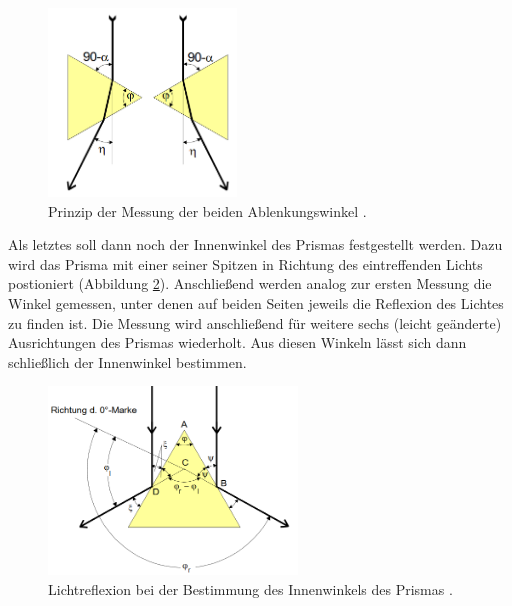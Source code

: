 \begin{figure}[H]
  \centering
  \includegraphics[height=5cm]{eta.PNG}
  \caption{Prinzip der Messung der beiden Ablenkungswinkel \cite{sample}.}
  \label{fig:eta}
\end{figure}

Als letztes soll dann noch der Innenwinkel des Prismas festgestellt werden. Dazu wird das Prisma mit einer seiner Spitzen in
Richtung des eintreffenden Lichts postioniert (Abbildung \ref{fig:phi}). Anschließend werden analog zur ersten Messung die Winkel gemessen, unter denen auf beiden Seiten jeweils
die Reflexion des Lichtes zu finden ist. Die Messung wird anschließend für weitere sechs (leicht geänderte) Ausrichtungen
des Prismas wiederholt. Aus diesen Winkeln lässt sich dann schließlich der Innenwinkel bestimmen.

\begin{figure}[H]
  \centering
  \includegraphics[height=5cm]{phi.PNG}
  \caption{Lichtreflexion bei der Bestimmung des Innenwinkels des Prismas \cite{sample}.}
  \label{fig:phi}
\end{figure}
